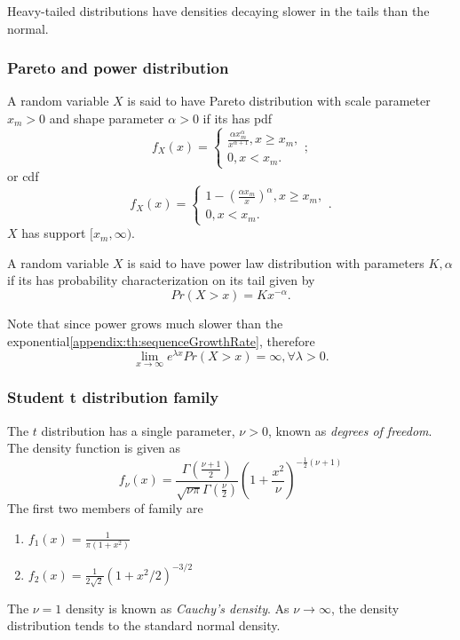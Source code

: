 \begin{refsection}
\begin{remark}[interpretation]
Heavy-tailed distributions have densities decaying  slower in the tails than the normal. 
\end{remark}

\subsubsection{Pareto and power distribution}

\begin{definition}
A random variable $X$ is said to have Pareto distribution with scale parameter $x_m > 0$ and shape parameter $\alpha > 0$ if its has pdf
$$f_X(x) = \begin{cases*}
\frac{\alpha x_m^\alpha}{ x^{\alpha + 1}}, x\geq x_m,\\
0, x < x_m.
\end{cases*};$$
or cdf
$$f_X(x) = \begin{cases*}
1 - (\frac{\alpha x_m}{ x})^\alpha, x\geq x_m,\\
0, x < x_m.
\end{cases*}.$$	
$X$ has support $[x_m,\infty)$.
\end{definition}



\begin{definition}\label{ch:theory-of-probability:def:powerLawDistribution}
	A random variable $X$ is said to have power law distribution with parameters $K, \alpha$ if its has probability characterization on its tail given by
	$$Pr(X > x) = Kx^{-\alpha}.$$
\end{definition}

\begin{remark}
Note that since power grows much slower than the exponential\autoref{appendix:th:sequenceGrowthRate}, therefore
 $$\lim_{x\to \infty} e^{\lambda x} Pr(X>x) = \infty, \forall \lambda > 0.$$
\end{remark}


\subsubsection{Student t distribution family}
\begin{definition}
The $t$ distribution has a single parameter, $\nu>0$, known as \emph{degrees of freedom}. The density function is given as
$$f_{\nu}(x) = \frac{\Gamma(\frac{\nu+1}{2})}{\sqrt{\nu \pi}\Gamma(\frac{\nu}{2})}(1+\frac{x^2}{\nu})^{-\frac{1}{2}(\nu+1)}$$
The first two members of family are
\begin{enumerate}
	\item $f_1(x) = \frac{1}{\pi(1+x^2)}$
	\item $f_2(x) = \frac{1}{2\sqrt{2}}(1+x^2/2)^{-3/2}$
\end{enumerate}	
The $\nu=1$ density is known as \emph{Cauchy's density}. As $\nu \rightarrow \infty$, the density distribution tends to the standard normal density.
\end{definition}



\end{refsection}
